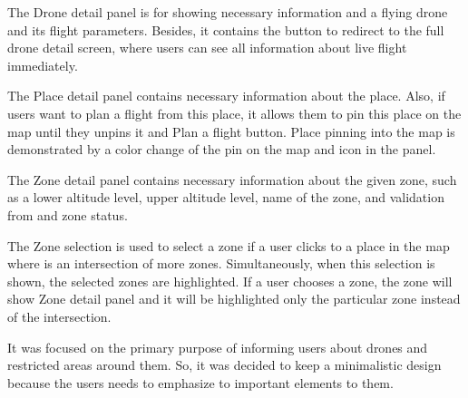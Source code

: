 The Drone detail panel is for showing necessary information and a flying drone and its flight parameters.
Besides, it contains the button to redirect to the full drone detail screen, where users can see all information about live flight immediately.

The Place detail panel contains necessary information about the place.
Also, if users want to plan a flight from this place, it allows them to pin this place on the map until they unpins it and Plan a flight button.
Place pinning into the map is demonstrated by a color change of the pin on the map and icon in the panel.

The Zone detail panel contains necessary information about the given zone, such as a lower altitude level, upper altitude level, name of the zone, and validation from and zone status.

The Zone selection is used to select a zone if a user clicks to a place in the map where is an intersection of more zones.
Simultaneously, when this selection is shown, the selected zones are highlighted.
If a user chooses a zone, the zone will show Zone detail panel and it will be highlighted only the particular zone instead of the intersection.

It was focused on the primary purpose of informing users about drones and restricted areas around them.
So, it was decided to keep a minimalistic design because the users needs to emphasize to important elements to them.


